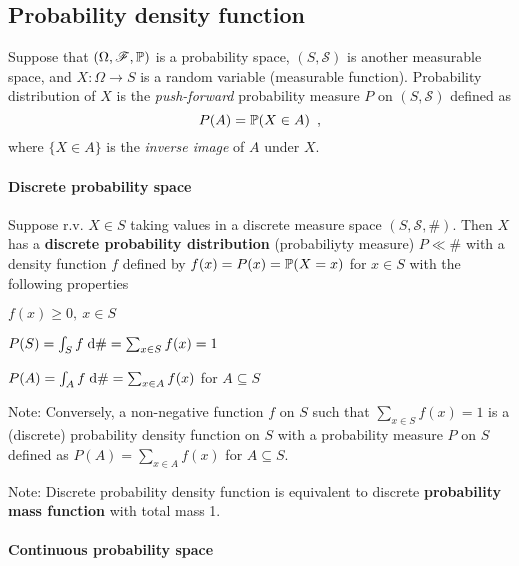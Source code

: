 \subsection{Probability density function}

Suppose that $(\Omega, \mathscr{F}, \mathbb{P})$ is a probability space, $(S, \mathscr{S})$ is another measurable space, and $X : \Omega \to S$ is a random variable (measurable function).
Probability distribution of $X$ is the \emph{push-forward} probability measure $P$ on $(S, \mathscr{S})$ defined as
\begin{equation}
P(A) = \mathbb{P}(X \in A) \enspace ,
\end{equation}
where $\{X \in A\}$ is the \emph{inverse image} of $A$ under $X$.

\paragraph{Discrete probability space}

\begin{definition}
Suppose r.v. $X \in S$ taking values in a discrete measure space $(S, \mathscr{S}, \#)$. Then $X$ has a \textbf{discrete probability distribution} (probabiliyty measure) $P \ll \#$ with a density function $f$ defined by $f(x) = P(x) = \mathbb{P}(X = x)$ for $x \in S$ with the following properties
\begin{compactitem}
\item $f(x) \geq 0, \ x \in S$
\item $P(S) = \int_S f \; \text{d} \# = \sum_{x \in S} f(x) = 1$
\item $P(A) = \int_A f \; \text{d} \# = \sum_{x \in A} f(x)$ for $A \subseteq S$
\end{compactitem}
Note: Conversely, a non-negative function $f$ on $S$ such that $\sum_{x \in S} f(x) = 1$ is a (discrete) probability density function on $S$ with a probability measure $P$ on $S$ defined as $P(A) = \sum_{x \in A} f(x)$ for $A \subseteq S$.

Note: Discrete probability density function is equivalent to discrete \textbf{probability mass function} with total mass 1.
\end{definition}

\paragraph{Continuous probability space}

